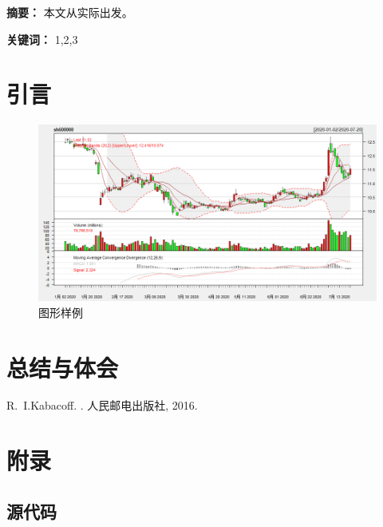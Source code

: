 \documentclass[10pt]{ctexart}
\begin{document}
    
    
    
    
    \xiaosihao
    \tableofcontents%
    \thispagestyle{empty}
    \clearpage
    
    \setcounter{page}{1}
    
    
    \newpage
    
    
    \textbf{\heiti 摘要：} 本文从实际出发。
    
    
    \textbf{\heiti 关键词：} 1,2,3
    
\section{引言}
    

    \begin{figure}[H]
        \centering
        \includegraphics[width=0.95\linewidth]{figs/1}
        \caption[图1]{图形样例}
        \label{fig:1}
    \end{figure}
    
    
\section{总结与体会}
    
    
\begin{thebibliography}{1}        
        
R.~I.Kabacoff.
.
\newblock 人民邮电出版社, 2016.


\end{thebibliography}
    
    
    \section{附录}
    
    \subsection{源代码}


    
    
\end{document}
